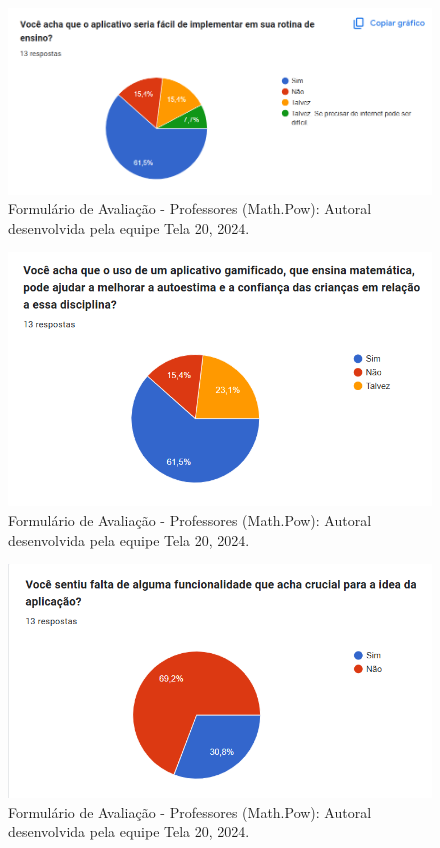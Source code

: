 \documentclass[12pt, openany, oneside, a4paper, english, brazil]{abntex2}   %
\begin{document}
\begin{figure}
    \centering
    \includegraphics{figuras/Formulário Gráficos/Professores/13 voce acha que o aplicativo seria facil de implementar em sua rotina de ensino.png}
    \caption{Formulário de Avaliação - Professores (Math.Pow):  Autoral desenvolvida pela equipe Tela 20, 2024.}
    \label{gráfico gerado pelo formulário}
\end{figure}

\begin{figure}
    \centering
    \includegraphics{figuras/Formulário Gráficos/Professores/14 Você acha que o uso de um aplicativo gamificado.png}
    \caption{Formulário de Avaliação - Professores (Math.Pow):  Autoral desenvolvida pela equipe Tela 20, 2024.}
    \label{gráfico gerado pelo formulário}
\end{figure}

\begin{figure}
    \centering
    \includegraphics{figuras/Formulário Gráficos/Professores/15 Voce sentiu falta de alguma funcionalidade que acha crucial.png}
    \caption{Formulário de Avaliação - Professores (Math.Pow):  Autoral desenvolvida pela equipe Tela 20, 2024.}
    \label{gráfico gerado pelo formulário}
\end{figure}
\end{document}
